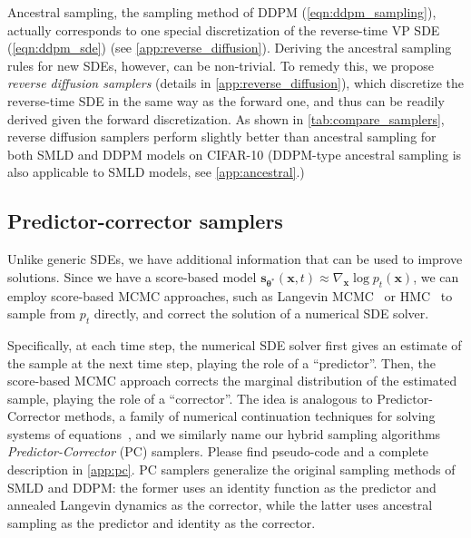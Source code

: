 \documentclass{article} %
\newcommand{\bfx}{\mathbf{x}}
\newcommand{\bftheta}{{\boldsymbol{\theta}}}
\newcommand{\bfs}{\mathbf{s}}
\begin{document}
Ancestral sampling, the sampling method of DDPM (\cref{eqn:ddpm_sampling}), actually corresponds to one special discretization of the reverse-time VP SDE (\cref{eqn:ddpm_sde}) (see \cref{app:reverse_diffusion}). Deriving the ancestral sampling rules for new SDEs, however, can be non-trivial. To remedy this, we propose \emph{reverse diffusion samplers} (details in \cref{app:reverse_diffusion}), which discretize the reverse-time SDE in the same way as the forward one, and thus can be readily derived given the forward discretization.
As shown in \cref{tab:compare_samplers}, reverse diffusion samplers perform slightly better than ancestral sampling for both SMLD and DDPM models on CIFAR-10 (DDPM-type ancestral sampling is also applicable to SMLD models, see \cref{app:ancestral}.)


\subsection{Predictor-corrector samplers}
Unlike generic SDEs, we have additional information that can be used to improve solutions. Since we have a score-based model $\bfs_{\bftheta^*}(\bfx, t) \approx \nabla_\bfx \log p_t(\bfx)$, we can employ score-based MCMC approaches, such as Langevin MCMC~\citep{parisi1981correlation,grenander1994representations} or HMC~\citep{neal2011mcmc} to sample from $p_t$ directly, and correct the solution of a numerical SDE solver. 

Specifically, at each time step, the numerical SDE solver first gives an estimate of the sample at the next time step, playing the role of a ``predictor''. Then, the score-based MCMC approach corrects the 
marginal distribution of the estimated sample, playing the role of a ``corrector''. The idea is analogous to Predictor-Corrector methods, a family of numerical continuation techniques for solving systems of equations~\citep{allgower2012numerical}, and we similarly name our hybrid sampling algorithms \emph{Predictor-Corrector} (PC) samplers. Please find pseudo-code and a complete description in \cref{app:pc}. PC samplers generalize the original sampling methods of SMLD and DDPM: the former uses an identity function as the predictor and annealed Langevin dynamics as the corrector, while the latter uses ancestral sampling as the predictor and identity as the corrector. %
\end{document}
